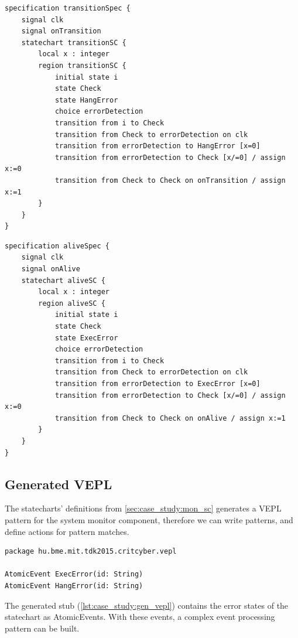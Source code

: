 \newpage
\begin{lstlisting}[caption={Statechart representation of hang error detection},label=lst:case_study:hang_error]
specification transitionSpec {
    signal clk
    signal onTransition
    statechart transitionSC {
        local x : integer
        region transitionSC {
            initial state i
            state Check
            state HangError
            choice errorDetection
            transition from i to Check
            transition from Check to errorDetection on clk
            transition from errorDetection to HangError [x=0]
            transition from errorDetection to Check [x/=0] / assign x:=0
            transition from Check to Check on onTransition / assign x:=1
        }
    }
}
\end{lstlisting}

\begin{lstlisting}[caption={Statechart representation of hang error detection},label=lst:case_study:hang_error]
specification aliveSpec {
    signal clk
    signal onAlive
    statechart aliveSC {
        local x : integer
        region aliveSC {
            initial state i
            state Check
            state ExecError
            choice errorDetection
            transition from i to Check
            transition from Check to errorDetection on clk
            transition from errorDetection to ExecError [x=0]
            transition from errorDetection to Check [x/=0] / assign x:=0
            transition from Check to Check on onAlive / assign x:=1
        }
    }
}
\end{lstlisting}

\newpage
\subsection{Generated VEPL}

The statecharts' definitions from \cref{sec:case_study:mon_sc} generates a VEPL pattern for the system monitor component, therefore we can write patterns, and define actions for pattern matches.

\begin{lstlisting}[caption={Generated VEPL definition},label=lst:case_study:gen_vepl]
package hu.bme.mit.tdk2015.critcyber.vepl

AtomicEvent ExecError(id: String)
AtomicEvent HangError(id: String)
\end{lstlisting}

\nohyphenation The generated stub (\cref{lst:case_study:gen_vepl}) contains the error states of the statechart as AtomicEvents. With these events, a complex event processing pattern can be built.
\\[1ex]

